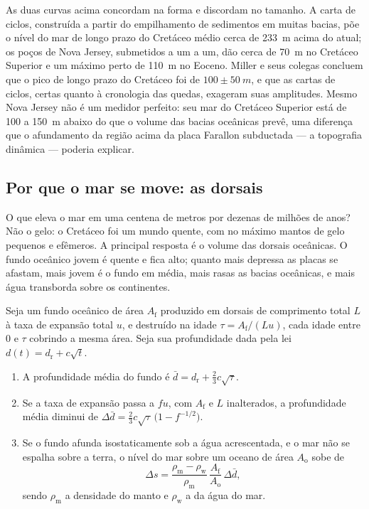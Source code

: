 As duas curvas acima concordam na forma e discordam no tamanho. A carta de ciclos, construída a partir
do empilhamento de sedimentos em muitas bacias, põe o nível do mar de longo prazo do Cretáceo médio
cerca de \qty{233}{m} acima do atual; os poços de Nova Jersey, submetidos a  um a um, dão cerca de
\qty{70}{m} no Cretáceo Superior e um máximo perto de \qty{110}{m} no Eoceno. Miller e seus
colegas concluem que o pico de longo prazo do Cretáceo foi de $100 \pm \qty{50}{m}$, e que as
cartas de ciclos, certas quanto à cronologia das quedas, exageram suas amplitudes. Mesmo Nova Jersey
não é um medidor perfeito: seu mar do Cretáceo Superior está de 100 a \qty{150}{m} abaixo do que o volume
das bacias oceânicas prevê, uma diferença que o afundamento da região acima da placa Farallon subductada
--- a topografia dinâmica --- poderia explicar.

\subsection*{Por que o mar se move: as dorsais}

O que eleva o mar em uma centena de metros por dezenas de milhões de anos? Não o gelo: o Cretáceo
foi um mundo quente, com no máximo mantos de gelo pequenos e efêmeros. A principal resposta é o volume das
dorsais oceânicas. O fundo oceânico jovem é quente e fica alto; quanto mais depressa as placas se afastam, mais
jovem é o fundo em média, mais rasas as bacias oceânicas, e mais água transborda sobre
os continentes.

\begin{proposition}\label{prop:b2:phanerozoic-earth:ridge}
Seja um fundo oceânico de área $A_{\text{f}}$ produzido em dorsais de comprimento total $L$ à taxa de
expansão total $u$, e destruído na idade $\tau = A_{\text{f}}/(Lu)$, cada idade entre 0
e $\tau$ cobrindo a mesma área. Seja sua profundidade dada pela lei $d(t) = d_{\text{r}} + c\sqrt t$.
\begin{enumerate}
  \item A profundidade média do fundo é $\bar d = d_{\text{r}} + \tfrac23 c\sqrt\tau$.
  \item Se a taxa de expansão passa a $fu$, com $A_{\text{f}}$ e $L$ inalterados, a profundidade
        média diminui de $\Delta\bar d = \tfrac23 c\sqrt\tau\,\bigl(1 - f^{-1/2}\bigr)$.
  \item Se o fundo afunda isostaticamente sob a água acrescentada, e o mar não se espalha
        sobre a terra, o nível do mar sobre um oceano de área $A_{\text{o}}$ sobe de
        \[
        \Delta s = \frac{\rho_{\text{m}} - \rho_{\text{w}}}{\rho_{\text{m}}}\,
        \frac{A_{\text{f}}}{A_{\text{o}}}\,\Delta\bar d ,
        \]
        sendo $\rho_{\text{m}}$ a densidade do manto e $\rho_{\text{w}}$ a da água do mar.
\end{enumerate}
\end{proposition}

